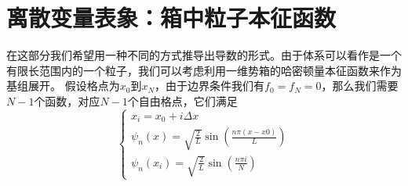 \documentclass[UTF8,12pt]{article}
\begin{document}
    \section{离散变量表象：箱中粒子本征函数}
        在这部分我们希望用一种不同的方式推导出导数的形式。由于体系可以看作是一个有限长范围内的一个粒子，我们可以考虑利用一维势箱的哈密顿量本征函数来作为基组展开。 假设格点为$x_0$到$x_N$，由于边界条件我们有$f_0=f_N=0$，那么我们需要$N-1$个函数，对应$N-1$个自由格点，它们满足
        \begin{equation}
            \begin{cases}
                x_i=x_0+i\Delta x \\
                \psi_n(x)=\sqrt{\frac{2}{L}}\sin(\frac{n\pi(x-x0)}{L}) \\
                \psi_n(x_i)=\sqrt{\frac{2}{L}}\sin(\frac{n\pi i}{N})
            \end{cases}
        \end{equation}
\end{document}
